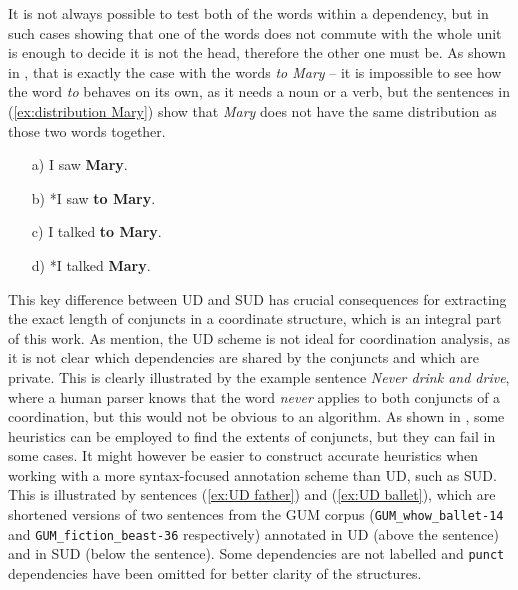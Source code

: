 It is not always possible to test both of the words within a dependency, but in such cases showing that one of the words does not commute with the whole unit is enough to decide it is not the head, therefore the other one must be. As shown in \cite{gerdes-etal-2018-sud}, that is exactly the case with the words \textsl{to Mary} -- it is impossible to see how the word \textsl{to} behaves on its own, as it needs a noun or a verb, but the sentences in (\ref{ex:distribution Mary}) show that \textsl{Mary} does not have the same distribution as those two words together.

\begin{exe}
    \ex
    \label{ex:distribution Mary}
    \begin{itemize}
        \item[a)] I saw \textbf{Mary}.
        \item[b)] *I saw \textbf{to Mary}.
        \item[c)] I talked \textbf{to Mary}.
        \item[d)] *I talked \textbf{Mary}.
    \end{itemize}
\end{exe}

This key difference between UD and SUD has crucial consequences for extracting the exact length of conjuncts in a coordinate structure, which is an integral part of this work. As \cite{prz:woz:23} mention, the UD scheme is not ideal for coordination analysis, as it is not clear which dependencies are shared by the conjuncts and which are private. This is clearly illustrated by the example sentence \textsl{Never drink and drive}, where a human parser knows that the word \textsl{never} applies to both conjuncts of a coordination, but this would not be obvious to an algorithm. As shown in \cite{pbg2023}, some heuristics can be employed to find the extents of conjuncts, but they can fail in some cases. It might however be easier to construct accurate heuristics when working with a more syntax-focused annotation scheme than UD, such as SUD. This is illustrated by sentences (\ref{ex:UD father}) and (\ref{ex:UD ballet}), which are shortened versions of two sentences from the GUM corpus (\texttt{GUM\_whow\_ballet-14} and \texttt{GUM\_fiction\_beast-36} respectively) annotated in UD (above the sentence) and in SUD (below the sentence). Some dependencies are not labelled and \texttt{punct} dependencies have been omitted for better clarity of the structures.

